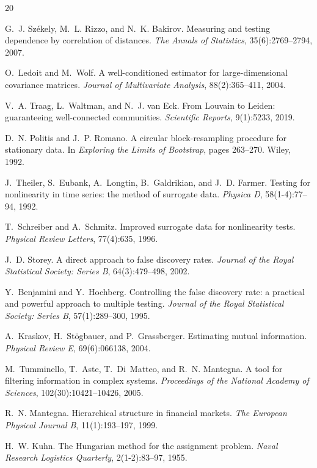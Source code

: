 \documentclass[12pt, letterpaper]{article}
\begin{document}

\begin{thebibliography}{20}

G.~J. Sz\'{e}kely, M.~L. Rizzo, and N.~K. Bakirov.
\newblock Measuring and testing dependence by correlation of distances.
\newblock \textit{The Annals of Statistics}, 35(6):2769--2794, 2007.

O.~Ledoit and M.~Wolf.
\newblock A well-conditioned estimator for large-dimensional covariance matrices.
\newblock \textit{Journal of Multivariate Analysis}, 88(2):365--411, 2004.

V.~A. Traag, L.~Waltman, and N.~J. van Eck.
\newblock From Louvain to Leiden: guaranteeing well-connected communities.
\newblock \textit{Scientific Reports}, 9(1):5233, 2019.

D.~N. Politis and J.~P. Romano.
\newblock A circular block-resampling procedure for stationary data.
\newblock In \textit{Exploring the Limits of Bootstrap}, pages 263--270. Wiley, 1992.

J.~Theiler, S.~Eubank, A.~Longtin, B.~Galdrikian, and J.~D. Farmer.
\newblock Testing for nonlinearity in time series: the method of surrogate data.
\newblock \textit{Physica D}, 58(1-4):77--94, 1992.

T.~Schreiber and A.~Schmitz.
\newblock Improved surrogate data for nonlinearity tests.
\newblock \textit{Physical Review Letters}, 77(4):635, 1996.

J.~D. Storey.
\newblock A direct approach to false discovery rates.
\newblock \textit{Journal of the Royal Statistical Society: Series B}, 64(3):479--498, 2002.

Y.~Benjamini and Y.~Hochberg.
\newblock Controlling the false discovery rate: a practical and powerful approach to multiple testing.
\newblock \textit{Journal of the Royal Statistical Society: Series B}, 57(1):289--300, 1995.

A.~Kraskov, H.~St\"{o}gbauer, and P.~Grassberger.
\newblock Estimating mutual information.
\newblock \textit{Physical Review E}, 69(6):066138, 2004.

M.~Tumminello, T.~Aste, T.~Di~Matteo, and R.~N. Mantegna.
\newblock A tool for filtering information in complex systems.
\newblock \textit{Proceedings of the National Academy of Sciences}, 102(30):10421--10426, 2005.

R.~N. Mantegna.
\newblock Hierarchical structure in financial markets.
\newblock \textit{The European Physical Journal B}, 11(1):193--197, 1999.

H.~W. Kuhn.
\newblock The Hungarian method for the assignment problem.
\newblock \textit{Naval Research Logistics Quarterly}, 2(1-2):83--97, 1955.

\end{thebibliography}
\end{document}
